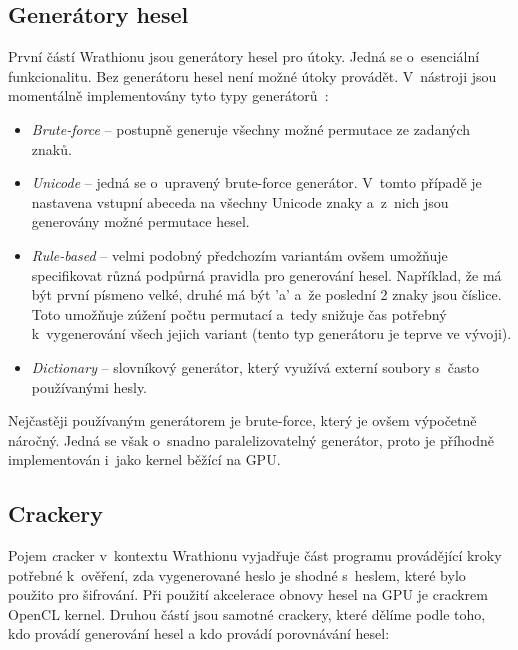 \subsection{Generátory hesel}
První částí Wrathionu jsou generátory hesel pro útoky. Jedná se o~esenciální
funkcionalitu. Bez generátoru hesel není možné útoky provádět. V~nástroji jsou momentálně
implementovány tyto typy generátorů~\cite{Hranicky}:
\begin{itemize}
    \item {\it Brute-force} -- postupně generuje všechny možné permutace ze zadaných znaků.
    \item {\it Unicode} -- jedná se o~upravený brute-force generátor. V~tomto případě je nastavena
	vstupní abeceda na všechny Unicode znaky a~z~nich jsou generovány možné permutace hesel.
    \item {\it Rule-based} -- velmi podobný předchozím variantám ovšem umožňuje specifikovat různá
	podpůrná pravidla pro generování hesel. Například, že má být první písmeno velké, druhé má
	být 'a' a~že poslední 2 znaky jsou číslice. Toto umožňuje zúžení počtu permutací a~tedy
	snižuje čas potřebný k~vygenerování všech jejich variant (tento typ generátoru je teprve
	ve vývoji).
    \item {\it Dictionary} -- slovníkový generátor, který využívá externí soubory s~často
	používanými hesly.
\end{itemize}
Nejčastěji používaným generátorem je brute-force, který je ovšem výpočetně náročný. Jedná se
však o~snadno paralelizovatelný generátor, proto je příhodně implementován i~jako kernel běžící na
GPU.
\subsection{Crackery}
Pojem {\textit cracker} v~kontextu Wrathionu vyjadřuje část programu provádějící kroky potřebné
k~ověření, zda vygenerované heslo je shodné s~heslem, které bylo použito pro šifrování. Při
použití akcelerace obnovy hesel na GPU je crackrem OpenCL kernel. Druhou částí jsou samotné
crackery, které dělíme podle toho, kdo provádí generování hesel a kdo provádí porovnávání hesel:
